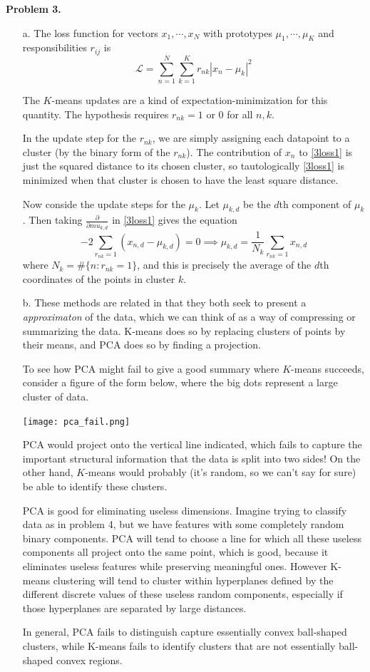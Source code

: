 \documentclass[12pt]{amsart}
\newcommand{\pderiv}[2]{\frac{\partial #1}{\partial #2}}
\theoremstyle{remark}
\begin{document}
\noindent \textbf{Problem 3.}
\begin{enumerate}
\item[a.]
The loss function for vectors $x_1,\cdots,x_N$ with prototypes $\mu_1,\cdots,\mu_K$ and responsibilities $r_{ij}$ is
\begin{equation}\label{3loss1}
\mathcal{L} = \sum_{n=1}^N \sum_{k=1}^K r_{nk}|x_n-\mu_k|^2
\end{equation}

The $K$-means updates are a kind of expectation-minimization for this quantity. The hypothesis requires $r_{nk} = 1$ or $0$ for all $n,k$. 

In the update step for the $r_{nk}$, we are simply assigning each datapoint to a cluster (by the binary form of the $r_{nk}$). The contribution of $x_n$ to \eqref{3loss1} is just the squared distance to its chosen cluster, so tautologically \eqref{3loss1} is minimized when that cluster is chosen to have the least square distance. 

Now conside the update steps for the $\mu_k$. Let $\mu_{k,d}$ be the $d$th component of $\mu_k$. Then taking $\pderiv{}{mu_{k,d}}$ in \eqref{3loss1} gives the equation 
\[
-2 \sum_{r_{nk} = 1} (x_{n,d} - \mu_{k,d}) = 0  \implies \mu_{k,d} = \frac{1}{N_k} \sum_{r_{nk}=1} x_{n,d}
\]
where $N_k  = \# \{n \colon r_{nk}=1\}$, and this is precisely the average of the $d$th coordinates of the points in cluster $k$. 

\item[b.] These methods are related in that they both seek to present a \emph{approximaton} of the data, which we can think of as a way of compressing or summarizing the data. K-means does so by replacing clusters of points by their means, and PCA does so by finding a projection. 

To see how PCA might fail to give a good summary where $K$-means succeeds, consider a figure of the form below, where the big dots represent a large cluster of data.

\texttt{[image: pca\_fail.png]}

PCA would project onto the vertical line indicated, which fails to capture the important structural information that the data is split into two sides! On the other hand, $K$-means would probably (it's random, so we can't say for sure) be able to identify these clusters. 

PCA is good for eliminating useless dimensions. Imagine trying to classify data as in problem 4, but we have features with some completely random binary components. PCA will tend to choose a line for which all these useless components all project onto the same point, which is good, because it eliminates useless features while preserving meaningful ones. However  K-means clustering will tend to cluster within hyperplanes defined by the different discrete values of these useless random components, especially if those hyperplanes are separated by large distances. 

In general, PCA fails to distinguish capture essentially convex ball-shaped clusters, while K-means fails to identify clusters that are not essentially ball-shaped convex regions. 

\end{enumerate}
\end{document}
